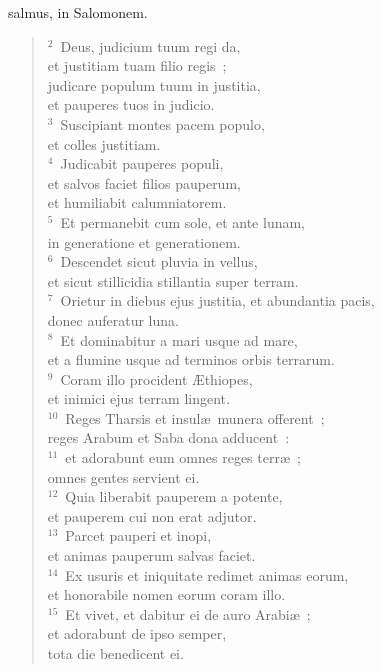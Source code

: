 \bchapter[Psalm]
salmus, in Salomonem.
\begin{verse}${}^{2}$~Deus, judicium tuum regi da,\\ et justitiam tuam filio regis~;\\ judicare populum tuum in justitia,\\ et pauperes tuos in judicio.\\
${}^{3}$~Suscipiant montes pacem populo,\\ et colles justitiam.\\
${}^{4}$~Judicabit pauperes populi,\\ et salvos faciet filios pauperum,\\ et humiliabit calumniatorem.\\
${}^{5}$~Et permanebit cum sole, et ante lunam,\\ in generatione et generationem.\\
${}^{6}$~Descendet sicut pluvia in vellus,\\ et sicut stillicidia stillantia super terram.\\
${}^{7}$~Orietur in diebus ejus justitia, et abundantia pacis,\\ donec auferatur luna.\\
${}^{8}$~Et dominabitur a mari usque ad mare,\\ et a flumine usque ad terminos orbis terrarum.\\
${}^{9}$~Coram illo procident \AE thiopes,\\ et inimici ejus terram lingent.\\
${}^{10}$~Reges Tharsis et insul\ae\ munera offerent~;\\ reges Arabum et Saba dona adducent~:\\
${}^{11}$~et adorabunt eum omnes reges terr\ae~;\\ omnes gentes servient ei.\\
${}^{12}$~Quia liberabit pauperem a potente,\\ et pauperem cui non erat adjutor.\\
${}^{13}$~Parcet pauperi et inopi,\\ et animas pauperum salvas faciet.\\
${}^{14}$~Ex usuris et iniquitate redimet animas eorum,\\ et honorabile nomen eorum coram illo.\\
${}^{15}$~Et vivet, et dabitur ei de auro Arabi\ae~;\\ et adorabunt de ipso semper,\\ tota die benedicent ei.\\

\end{verse}
